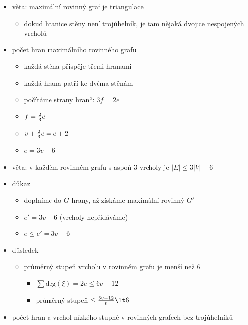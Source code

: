 \begin{itemize}
\begin{itemize}
\begin{itemize}
\begin{itemize}
\item $v'=v,\quad e'=e-1,\quad f'=f-1$
\item z IP: $v'+f'=e'+2$
\item po dosazení: $v+f-1=e-1+2$
\item k oběma stranám přičteme jedničku
\item $v+f=e+2\quad\square$
\end{itemize}
\end{itemize}
\item věta: maximální rovinný graf je triangulace
\begin{itemize}
\item dokud hranice stěny není trojúhelník, je tam nějaká dvojice nespojených vrcholů
\end{itemize}
\item počet hran maximálního rovinného grafu
\begin{itemize}
\item každá stěna přispěje třemi hranami
\item každá hrana patří ke dvěma stěnám
\item počítáme \quotedblbase{}strany hran\textquotedblleft{}: $3f=2e$
\item $f={2\over 3}e$
\item $v+{2\over 3}e=e+2$
\item $e=3v-6$
\end{itemize}
\item věta: v každém rovinném grafu s aspoň 3 vrcholy je $|E|\leq 3|V|-6$
\item důkaz
\begin{itemize}
\item doplníme do $G$ hrany, až získáme maximální rovinný $G'$
\item $e'=3v-6$ (vrcholy nepřidáváme)
\item $e\leq e'=3v-6$
\end{itemize}
\item důsledek
\begin{itemize}
\item průměrný stupeň vrcholu v rovinném grafu je menší než 6
\begin{itemize}
\item $\sum \text{deg}(\xi)=2e\leq 6v-12$
\item průměrný stupeň $\leq {6v-12\over v}\lt 6$
\end{itemize}
\end{itemize}
\item počet hran a vrchol nízkého stupně v rovinných grafech bez trojúhelníků

\end{itemize}
\end{itemize}
